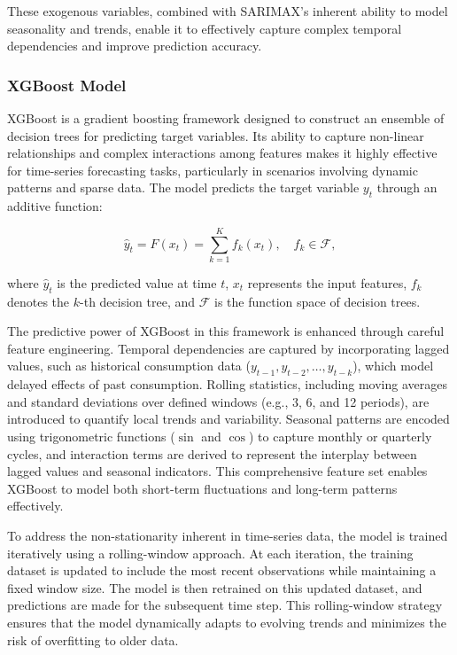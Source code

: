 \documentclass[journal]{IEEEtran}
\begin{document}
These exogenous variables, combined with SARIMAX’s inherent ability to model seasonality and trends, enable it to effectively capture complex temporal dependencies and improve prediction accuracy.

\subsubsection{XGBoost Model}

XGBoost is a gradient boosting framework designed to construct an ensemble of decision trees for predicting target variables. Its ability to capture non-linear relationships and complex interactions among features makes it highly effective for time-series forecasting tasks, particularly in scenarios involving dynamic patterns and sparse data. The model predicts the target variable \(y_t\) through an additive function:

\begin{equation}
\hat{y}_{t} = F(x_{t}) = \sum_{k=1}^{K} f_{k}(x_{t}), \quad f_{k} \in \mathcal{F},
\end{equation}

where \(\hat{y}_{t}\) is the predicted value at time \(t\), \(x_{t}\) represents the input features, \(f_{k}\) denotes the \(k\)-th decision tree, and \(\mathcal{F}\) is the function space of decision trees.

The predictive power of XGBoost in this framework is enhanced through careful feature engineering. Temporal dependencies are captured by incorporating lagged values, such as historical consumption data (\(y_{t-1}, y_{t-2}, \dots, y_{t-k}\)), which model delayed effects of past consumption. Rolling statistics, including moving averages and standard deviations over defined windows (e.g., 3, 6, and 12 periods), are introduced to quantify local trends and variability. Seasonal patterns are encoded using trigonometric functions (\(\sin\) and \(\cos\)) to capture monthly or quarterly cycles, and interaction terms are derived to represent the interplay between lagged values and seasonal indicators. This comprehensive feature set enables XGBoost to model both short-term fluctuations and long-term patterns effectively.

To address the non-stationarity inherent in time-series data, the model is trained iteratively using a rolling-window approach. At each iteration, the training dataset is updated to include the most recent observations while maintaining a fixed window size. The model is then retrained on this updated dataset, and predictions are made for the subsequent time step. This rolling-window strategy ensures that the model dynamically adapts to evolving trends and minimizes the risk of overfitting to older data.
\end{document}
